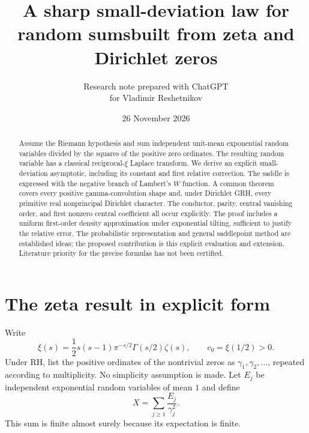 \documentclass[11pt]{article}
\title{A sharp small-deviation law for random sums\newline built from zeta and Dirichlet zeros}
\author{Research note prepared with ChatGPT\\for Vladimir Reshetnikov}
\date{26 November 2026}
\theoremstyle{remark}\newtheorem{remark}[theorem]{Remark}
\begin{document}
\maketitle

\begin{abstract}
Assume the Riemann hypothesis and sum independent unit-mean exponential
random variables divided by the squares of the positive zero ordinates.
The resulting random variable has a classical reciprocal-$\xi$ Laplace
transform. We derive an explicit small-deviation asymptotic, including its
constant and first relative correction. The saddle is expressed with the
negative branch of Lambert's $W$ function. A common theorem covers every
positive gamma-convolution shape and, under Dirichlet GRH, every primitive
real nonprincipal Dirichlet character. The conductor, parity, central
vanishing order, and first nonzero central coefficient all occur explicitly.
The proof includes a uniform first-order density approximation under
exponential tilting, sufficient to justify the relative error. The
probabilistic representation and general saddlepoint method are established
ideas; the proposed contribution is this explicit evaluation and extension.
Literature priority for the precise formulas has not been certified.
\end{abstract}

\section{The zeta result in explicit form}

Write
\begin{equation}\label{eq:xi}
 \xi(s)=\frac12s(s-1)\pi^{-s/2}\Gamma(s/2)\zeta(s),
 \qquad c_0=\xi(1/2)>0.
\end{equation}
Under RH, list the positive ordinates of the nontrivial zeros as
$\gamma_1,\gamma_2,\ldots$, repeated according to multiplicity. No simplicity
assumption is made. Let $E_j$ be independent exponential random variables of
mean $1$ and define
\[
 X=\sum_{j\geq1}\frac{E_j}{\gamma_j^2}.
\]
This sum is finite almost surely because its expectation is finite.
\end{document}
